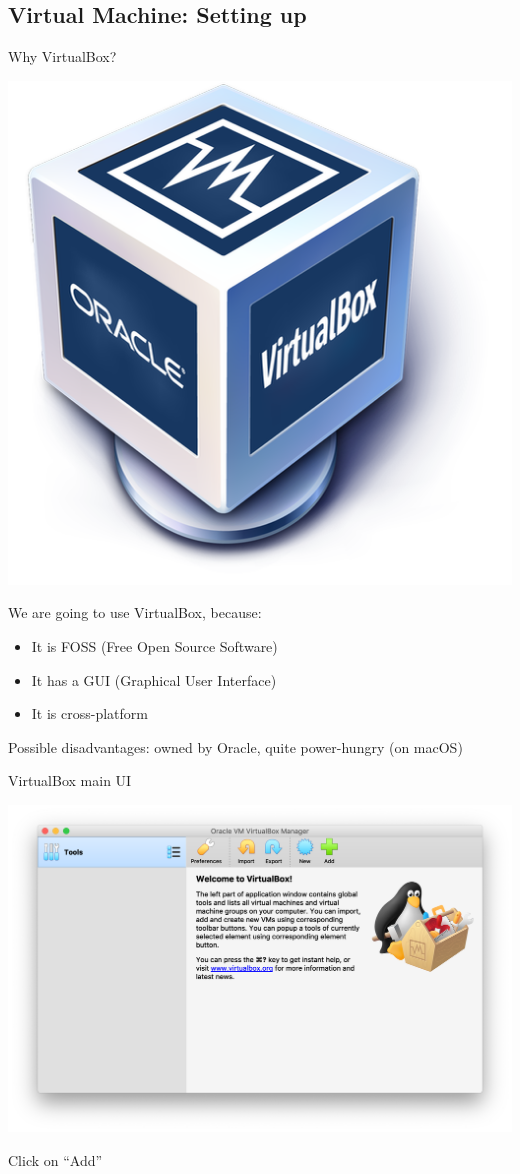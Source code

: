 \documentclass[11pt]{beamer}
\begin{document}
\subsection{Virtual Machine: Setting up}
\begin{frame}{Why VirtualBox?}
  \begin{center}
    \includegraphics[width=0.25\linewidth]{virtualbox}
  \end{center}

  We are going to use VirtualBox, because:
  \begin{itemize}
    \item It is FOSS (Free Open Source Software)
    \item It has a GUI (Graphical User Interface)
    \item It is cross-platform
  \end{itemize}

  Possible disadvantages: owned by Oracle, quite power-hungry (on macOS)
\end{frame}

\begin{frame}{VirtualBox main UI}
  \begin{center}
    \includegraphics[width=0.8\linewidth]{vb-main}
  \end{center}
  Click on ``Add''
\end{frame}
\end{document}

